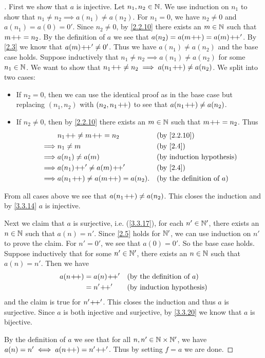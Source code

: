 \begin{proof}[]
	First we show that \(a\) is injective.
	Let \(n_1, n_2 \in \mathbb{N}\).
	We use induction on \(n_1\) to show that \(n_1 \neq n_2 \implies a(n_1) \neq a(n_2)\).
	For \(n_1 = 0\), we have \(n_2 \neq 0\) and \(a(n_1) = a(0) = 0'\).
	Since \(n_2 \neq 0\), by \cref{2.2.10} there exists an \(m \in \mathbb{N}\) such that \(m\!+\!\!+ = n_2\).
	By the definition of \(a\) we see that \(a(n_2) = a(m\!+\!\!+) = a(m)\!+\!\!+'\).
	By \cref{2.3} we know that \(a(m)\!+\!\!+' \neq 0'\).
	Thus we have \(a(n_1) \neq a(n_2)\) and the base case holds.
	Suppose inductively that \(n_1 \neq n_2 \implies a(n_1) \neq a(n_2)\) for some \(n_1 \in \mathbb{N}\).
	We want to show that \(n_1\!+\!\!+ \neq n_2 \implies a(n_1\!+\!\!+) \neq a(n_2)\).
	We split into two cases:
	\begin{itemize}
		\item If \(n_2 = 0\), then we can use the identical proof as in the base case but replacing \((n_1, n_2)\) with \((n_2, n_1\!+\!\!+)\) to see that \(a(n_1\!+\!\!+) \neq a(n_2)\).
		\item If \(n_2 \neq 0\), then by \cref{2.2.10} there exists an \(m \in \mathbb{N}\) such that \(m\!+\!\!+ = n_2\).
		      Thus
		      \begin{align*}
			               & n_1\pp \neq m\pp = n_2           &  & \by{2.2.10}                         \\
			      \implies & n_1 \neq m                       &  & \by{2.4}                            \\
			      \implies & a(n_1) \neq a(m)                 &  & \byIH                               \\
			      \implies & a(n_1)\pp' \neq a(m)\pp'         &  & \by{2.4}                            \\
			      \implies & a(n_1\pp) \neq a(m\pp) = a(n_2). &  & \text{(by the definition of \(a\))}
		      \end{align*}
	\end{itemize}
	From all cases above we see that \(a(n_1\!+\!\!+) \neq a(n_2)\).
	This closes the induction and by \cref{3.3.14} \(a\) is injective.

	Next we claim that \(a\) is surjective, i.e. (\cref{3.3.17}), for each \(n' \in \mathbb{N}'\), there exists an \(n \in \mathbb{N}\) such that \(a(n) = n'\).
	Since \cref{2.5} holds for \(\mathbb{N}'\), we can use induction on \(n'\) to prove the claim.
	For \(n' = 0'\), we see that \(a(0) = 0'\).
	So the base case holds.
	Suppose inductively that for some \(n' \in \mathbb{N}'\), there exists an \(n \in \mathbb{N}\) such that \(a(n) = n'\).
	Then we have
	\begin{align*}
		a(n\pp) & = a(n)\pp' &  & \text{(by the definition of \(a\))} \\
		        & = n'\pp'   &  & \byIH
	\end{align*}
	and the claim is true for \(n'\!+\!\!+'\).
	This closes the induction and thus \(a\) is surjective.
	Since \(a\) is both injective and surjective, by \cref{3.3.20} we know that \(a\) is bijective.

	By the definition of \(a\) we see that for all \(n, n' \in \mathbb{N} \times \mathbb{N}'\), we have \(a(n) = n' \iff a(n\!+\!\!+) = n'\!+\!\!+'\).
	Thus by setting \(f = a\) we are done.
\end{proof}
